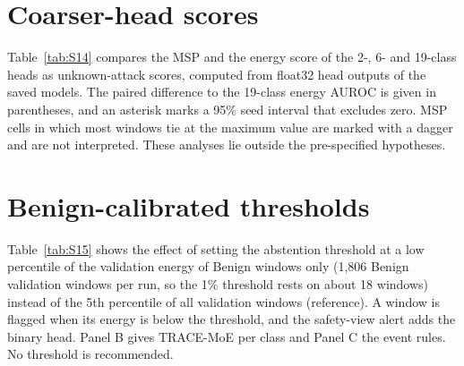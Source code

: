 \documentclass[10pt,a4paper]{article}
\begin{document}
\section{Coarser-head scores}\label{sec:n12}
Table~\ref{tab:S14} compares the MSP and the energy score of the 2-, 6- and 19-class heads as unknown-attack scores, computed from float32 head outputs of the saved models. The paired difference to the 19-class energy AUROC is given in parentheses, and an asterisk marks a 95\% seed interval that excludes zero. MSP cells in which most windows tie at the maximum value are marked with a dagger and are not interpreted. These analyses lie outside the pre-specified hypotheses.


\section{Benign-calibrated thresholds}\label{sec:n13}
Table~\ref{tab:S15} shows the effect of setting the abstention threshold at a low percentile of the validation energy of Benign windows only (1,806 Benign validation windows per run, so the 1\% threshold rests on about 18 windows) instead of the 5th percentile of all validation windows (reference). A window is flagged when its energy is below the threshold, and the safety-view alert adds the binary head. Panel B gives TRACE-MoE per class and Panel C the event rules. No threshold is recommended.


\FloatBarrier
\end{document}
